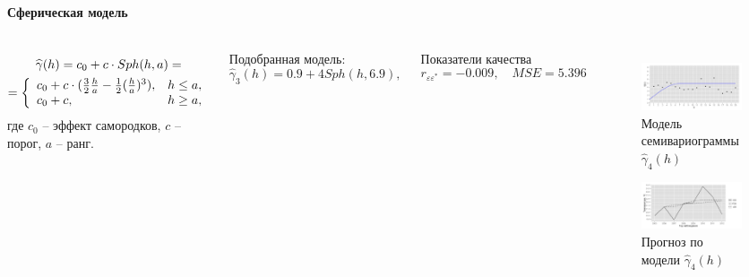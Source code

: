 \documentclass[notheorems]{beamer}
\theoremstyle{definition}
\theoremstyle{example}
\theoremstyle{plain}
\begin{document}
\begin{frame}
  \frametitle{\large\subsecname}
  \framesubtitle{Сферическая модель}
  \begin{columns}[c]
  \column{3in}
  \begin{equation}\begin{gathered}
  \label{eq:sph}
    \widehat{\gamma}(h) = c_0 + c \cdot Sph(h, a) = \\
    = \left\{
    \begin{array}{l l}
      c_0 + c \cdot (\frac{3}{2} \frac{h}{a} - \frac{1}{2}(\frac{h}{a})^3), & h \le a, \\
      c_0 + c, & h \geq a,
    \end{array} \right.
  \end{gathered}\end{equation}
  где $ c_0 $ -- эффект самородков, $ c $ -- порог, $ a $ -- ранг.

  \vspace{0.5em}

  Подобранная модель:
  \begin{equation}
  \label{eq:gamma5}
    \widehat{\gamma}_3(h) = 0.9 + 4 Sph(h, 6.9),
  \end{equation}

  Показатели качества
  \begin{equation*}
    r_{\varepsilon\varepsilon^{*}} = -0.009, \quad MSE = 5.396
  \end{equation*}

  \column{3in}
  \vspace{-14.5pt}
  \begin{figure}[H]
    \includegraphics[width=0.9\linewidth]{../../figures/variogram/sph-fit-adapt-modeled.png} \\
    \caption{Модель семивариограммы $\widehat{\gamma}_4(h)$}
    \includegraphics[width=0.9\linewidth]{../../figures/variogram/sph-fit-adapt-cross-prediction.png}
    \caption{Прогноз по модели $\widehat{\gamma}_4(h)$}
  \end{figure}
  \end{columns}
\end{frame}
\end{document}
